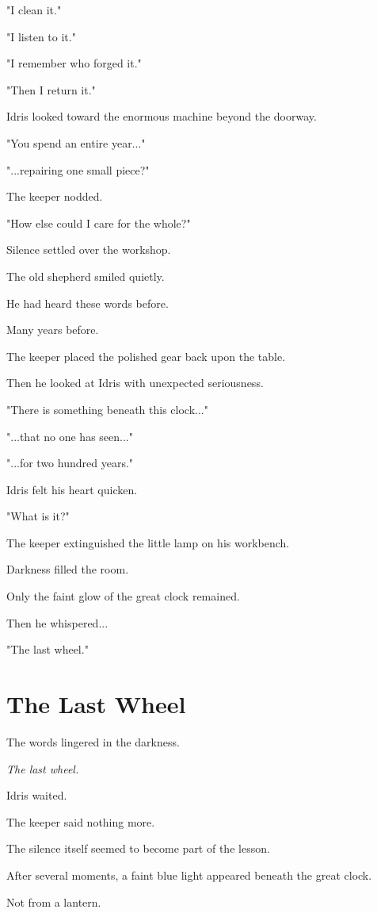 \documentclass[12pt,openany]{book}
\begin{document}
"I clean it."

"I listen to it."

"I remember who forged it."

"Then I return it."

Idris looked toward the enormous machine beyond the doorway.

"You spend an entire year..."

"...repairing one small piece?"

The keeper nodded.

"How else could I care for the whole?"

Silence settled over the workshop.

The old shepherd smiled quietly.

He had heard these words before.

Many years before.

The keeper placed the polished gear back upon the table.

Then he looked at Idris with unexpected seriousness.

"There is something beneath this clock..."

"...that no one has seen..."

"...for two hundred years."

Idris felt his heart quicken.

"What is it?"

The keeper extinguished the little lamp on his workbench.

Darkness filled the room.

Only the faint glow of the great clock remained.

Then he whispered...

"The last wheel."

\section*{The Last Wheel}

The words lingered in the darkness.

\emph{The last wheel.}

Idris waited.

The keeper said nothing more.

The silence itself seemed to become part of the lesson.

After several moments, a faint blue light appeared beneath the great clock.

Not from a lantern.
\end{document}
